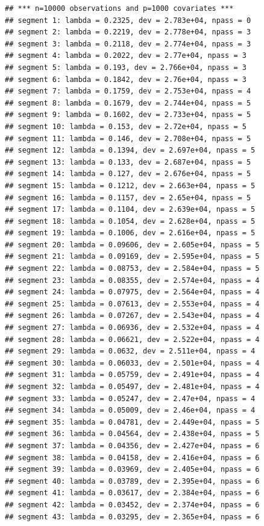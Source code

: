 \documentclass[
]{article}
\begin{document}
\begin{verbatim}
## *** n=10000 observations and p=1000 covariates ***
## segment 1: lambda = 0.2325, dev = 2.783e+04, npass = 0
## segment 2: lambda = 0.2219, dev = 2.778e+04, npass = 3
## segment 3: lambda = 0.2118, dev = 2.774e+04, npass = 3
## segment 4: lambda = 0.2022, dev = 2.77e+04, npass = 3
## segment 5: lambda = 0.193, dev = 2.766e+04, npass = 3
## segment 6: lambda = 0.1842, dev = 2.76e+04, npass = 3
## segment 7: lambda = 0.1759, dev = 2.753e+04, npass = 4
## segment 8: lambda = 0.1679, dev = 2.744e+04, npass = 5
## segment 9: lambda = 0.1602, dev = 2.733e+04, npass = 5
## segment 10: lambda = 0.153, dev = 2.72e+04, npass = 5
## segment 11: lambda = 0.146, dev = 2.708e+04, npass = 5
## segment 12: lambda = 0.1394, dev = 2.697e+04, npass = 5
## segment 13: lambda = 0.133, dev = 2.687e+04, npass = 5
## segment 14: lambda = 0.127, dev = 2.676e+04, npass = 5
## segment 15: lambda = 0.1212, dev = 2.663e+04, npass = 5
## segment 16: lambda = 0.1157, dev = 2.65e+04, npass = 5
## segment 17: lambda = 0.1104, dev = 2.639e+04, npass = 5
## segment 18: lambda = 0.1054, dev = 2.628e+04, npass = 5
## segment 19: lambda = 0.1006, dev = 2.616e+04, npass = 5
## segment 20: lambda = 0.09606, dev = 2.605e+04, npass = 5
## segment 21: lambda = 0.09169, dev = 2.595e+04, npass = 5
## segment 22: lambda = 0.08753, dev = 2.584e+04, npass = 5
## segment 23: lambda = 0.08355, dev = 2.574e+04, npass = 4
## segment 24: lambda = 0.07975, dev = 2.564e+04, npass = 4
## segment 25: lambda = 0.07613, dev = 2.553e+04, npass = 4
## segment 26: lambda = 0.07267, dev = 2.543e+04, npass = 4
## segment 27: lambda = 0.06936, dev = 2.532e+04, npass = 4
## segment 28: lambda = 0.06621, dev = 2.522e+04, npass = 4
## segment 29: lambda = 0.0632, dev = 2.511e+04, npass = 4
## segment 30: lambda = 0.06033, dev = 2.501e+04, npass = 4
## segment 31: lambda = 0.05759, dev = 2.491e+04, npass = 4
## segment 32: lambda = 0.05497, dev = 2.481e+04, npass = 4
## segment 33: lambda = 0.05247, dev = 2.47e+04, npass = 4
## segment 34: lambda = 0.05009, dev = 2.46e+04, npass = 4
## segment 35: lambda = 0.04781, dev = 2.449e+04, npass = 5
## segment 36: lambda = 0.04564, dev = 2.438e+04, npass = 5
## segment 37: lambda = 0.04356, dev = 2.427e+04, npass = 6
## segment 38: lambda = 0.04158, dev = 2.416e+04, npass = 6
## segment 39: lambda = 0.03969, dev = 2.405e+04, npass = 6
## segment 40: lambda = 0.03789, dev = 2.395e+04, npass = 6
## segment 41: lambda = 0.03617, dev = 2.384e+04, npass = 6
## segment 42: lambda = 0.03452, dev = 2.374e+04, npass = 6
## segment 43: lambda = 0.03295, dev = 2.365e+04, npass = 6

\end{verbatim}
\end{document}
